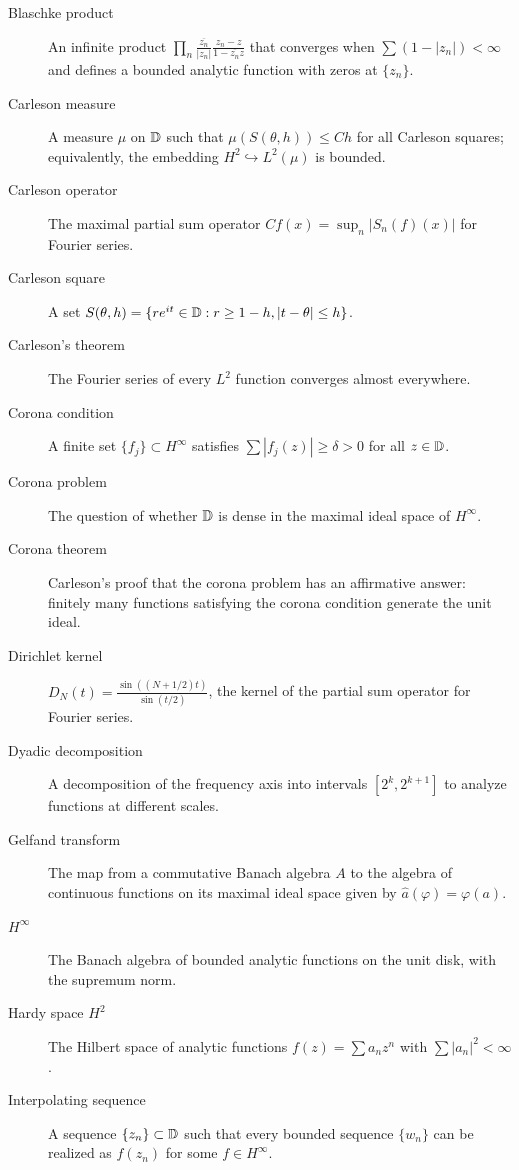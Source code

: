 \begin{description}
    \item[Blaschke product] An infinite product \(\prod_n \frac{\overline{z_n}}{|z_n|} \frac{z_n - z}{1 - \overline{z_n}z}\) that converges when \(\sum (1-|z_n|) < \infty\) and defines a bounded analytic function with zeros at \(\{z_n\}\).
    \item[Carleson measure] A measure \(\mu\) on \(\mathbb{D}\) such that \(\mu(S(\theta, h)) \leq C h\) for all Carleson squares; equivalently, the embedding \(H^2 \hookrightarrow L^2(\mu)\) is bounded.
    \item[Carleson operator] The maximal partial sum operator \(C f(x) = \sup_n |S_n(f)(x)|\) for Fourier series.
    \item[Carleson square] A set \(S(\theta, h) = \{re^{it} \in \mathbb{D} : r \geq 1-h, |t-\theta| \leq h\}\).
    \item[Carleson's theorem] The Fourier series of every \(L^2\) function converges almost everywhere.
    \item[Corona condition] A finite set \(\{f_j\} \subset H^\infty\) satisfies \(\sum |f_j(z)| \geq \delta > 0\) for all \(z \in \mathbb{D}\).
    \item[Corona problem] The question of whether \(\mathbb{D}\) is dense in the maximal ideal space of \(H^\infty\).
    \item[Corona theorem] Carleson's proof that the corona problem has an affirmative answer: finitely many functions satisfying the corona condition generate the unit ideal.
    \item[Dirichlet kernel] \(D_N(t) = \frac{\sin((N+1/2)t)}{\sin(t/2)}\), the kernel of the partial sum operator for Fourier series.
    \item[Dyadic decomposition] A decomposition of the frequency axis into intervals \([2^k, 2^{k+1}]\) to analyze functions at different scales.
    \item[Gelfand transform] The map from a commutative Banach algebra \(A\) to the algebra of continuous functions on its maximal ideal space given by \(\widehat{a}(\varphi) = \varphi(a)\).
    \item[\(H^\infty\)] The Banach algebra of bounded analytic functions on the unit disk, with the supremum norm.
    \item[Hardy space \(H^2\)] The Hilbert space of analytic functions \(f(z) = \sum a_n z^n\) with \(\sum |a_n|^2 < \infty\).
    \item[Interpolating sequence] A sequence \(\{z_n\} \subset \mathbb{D}\) such that every bounded sequence \(\{w_n\}\) can be realized as \(f(z_n)\) for some \(f \in H^\infty\).

\end{description}
